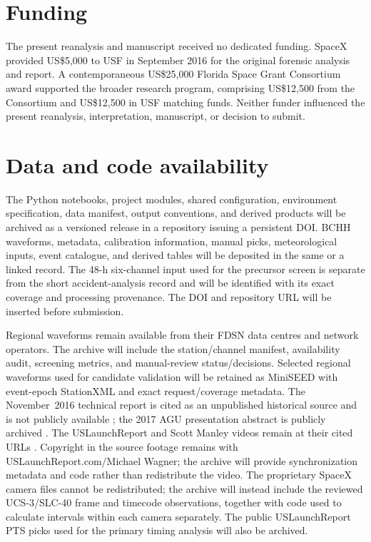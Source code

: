 \documentclass[]{seismica}
\begin{document}
\section*{Funding}

The present reanalysis and manuscript received no dedicated funding. SpaceX
provided US\$5,000 to USF in September 2016 for the original forensic analysis
and report. A contemporaneous US\$25,000 Florida Space Grant Consortium award
supported the broader research program, comprising US\$12,500 from the
Consortium and US\$12,500 in USF matching funds. Neither funder influenced the
present reanalysis, interpretation, manuscript, or decision to submit.


\section*{Data and code availability}

The Python notebooks, project modules, shared configuration, environment
specification, data manifest, output conventions, and derived products will be
archived as a versioned release in a repository issuing a persistent DOI. BCHH
waveforms, metadata, calibration information, manual picks, meteorological
inputs, event catalogue, and derived tables will be deposited in the same or a
linked record. The 48-h six-channel input used for the precursor screen is
separate from the short accident-analysis record and will be identified with
its exact coverage and processing provenance. The DOI and repository URL will be inserted before submission.

Regional waveforms remain available from their FDSN data centres and network
operators. The archive will include the station/channel manifest, availability
audit, screening metrics, and manual-review status/decisions. Selected regional
waveforms used for candidate validation will be retained as MiniSEED with
event-epoch StationXML and exact request/coverage metadata. The November~2016
technical report is cited as an unpublished historical source and is not
publicly available \citep{thompson_mcnutt_fireball_2016}; the 2017 AGU
presentation abstract is publicly archived \citep{thompson_agu_falcon9_2017}. The USLaunchReport and
Scott Manley videos remain at their cited URLs
\citep{uslaunchreport_amos6_video_2016,manley_spacex_explosion_2016}. Copyright
in the source footage remains with USLaunchReport.com/Michael Wagner; the
archive will provide synchronization metadata and code rather than redistribute
the video. The proprietary SpaceX camera files cannot be redistributed; the archive
will instead include the reviewed UCS-3/SLC-40 frame and timecode observations,
together with code used to calculate intervals within each camera separately.
The public USLaunchReport PTS picks used for the primary timing analysis will
also be archived.
\end{document}
